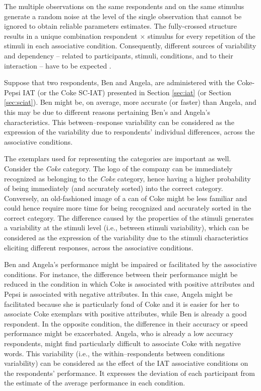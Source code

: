 \documentclass[12pt]{book}
\begin{document}
The multiple observations on the same respondents and on the same stimulus generate a random noise at the level of the single observation that cannot be ignored to obtain reliable parameters estimates. The fully-crossed structure results in a unique combination respondent $\times$ stimulus for every repetition of the stimuli in each associative condition. Consequently, different sources of variability and dependency -- related to participants, stimuli, conditions, and to their interaction -- have to be expected \cite{Barr2013, Westfall2014, wols2017}. 

Suppose that two respondents, Ben and Angela, are administered with the Coke-Pepsi IAT (or the Coke SC-IAT) presented in Section \ref{sec:iat} (or Section \ref{sec:sciat}). Ben might be, on average, more accurate (or faster) than Angela, and this may be due to different reasons pertaining Ben's and Angela's characteristics. This between--response variability can be considered as the expression of the variability due to respondents' individual differences, across the associative conditions. 

The exemplars used for representing the categories are important as well. Consider the \emph{Coke} category. The logo of the company can be immediately recognized as belonging to the \emph{Coke} category, hence having a higher probability of being immediately (and accurately sorted)  into the correct category. Conversely, an old-fashioned image of a can of Coke might be less familiar and could hence require more time for being recognized and accurately sorted in the correct category. The difference caused by the properties of the stimuli generates a variability at the stimuli level (i.e., between stimuli variability), which can be considered as the expression of the variability due to the stimuli characteristics eliciting different responses, across the associative conditions. 

Ben and Angela's performance might be impaired or facilitated by the associative conditions. For instance, the difference between their performance might be reduced in the condition in which Coke is associated with positive attributes and Pepsi is associated with negative attributes. In this case, Angela might be facilitated because she is particularly fond of Coke and it is easier for her to associate Coke exemplars with positive attributes, while Ben is already a good respondent. In the opposite condition, the difference in their accuracy or speed performance might be exacerbated. Angela, who is already a low accuracy respondents, might find particularly difficult to associate Coke with negative words. This variability (i.e., the within--respondents between conditions variability) can be considered as the effect of the IAT associative conditions on the respondents' performance. It expresses the deviation of each participant from the estimate of the average performance in each condition. 
\end{document}
